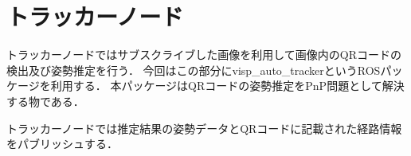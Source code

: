 \section{トラッカーノード}
\label{proposed_tracker}
トラッカーノードではサブスクライブした画像を利用して画像内のQRコードの検出及び姿勢推定を行う．
今回はこの部分にvisp\_auto\_trackerというROSパッケージを利用する．
本パッケージはQRコードの姿勢推定をPnP問題として解決する物である．

トラッカーノードでは推定結果の姿勢データとQRコードに記載された経路情報をパブリッシュする．
